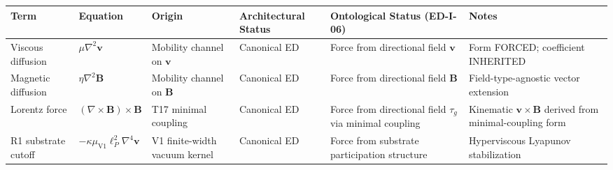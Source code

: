 \documentclass[
]{article}
\newcounter{none} %
\begin{document}
{\def\LTcaptype{none} %
\begin{longtable}[]{@{}
  >{\raggedright\arraybackslash}p{}
  >{\raggedright\arraybackslash}p{}
  >{\raggedright\arraybackslash}p{}
  >{\raggedright\arraybackslash}p{}
  >{\raggedright\arraybackslash}p{}
  >{\raggedright\arraybackslash}p{}@{}}
\toprule\noalign{}
\begin{minipage}[b]{\linewidth}\raggedright
Term
\end{minipage} & \begin{minipage}[b]{\linewidth}\raggedright
Equation
\end{minipage} & \begin{minipage}[b]{\linewidth}\raggedright
Origin
\end{minipage} & \begin{minipage}[b]{\linewidth}\raggedright
Architectural Status
\end{minipage} & \begin{minipage}[b]{\linewidth}\raggedright
Ontological Status (ED-I-06)
\end{minipage} & \begin{minipage}[b]{\linewidth}\raggedright
Notes
\end{minipage} \\
\midrule\noalign{}
\endhead
\bottomrule\noalign{}
\endlastfoot
Viscous diffusion & \(\mu\nabla^2\mathbf{v}\) & Mobility channel on
\(\mathbf{v}\) & Canonical ED & Force from directional field
\(\mathbf{v}\) & Form FORCED; coefficient INHERITED \\
Magnetic diffusion & \(\eta\nabla^2\mathbf{B}\) & Mobility channel on
\(\mathbf{B}\) & Canonical ED & Force from directional field
\(\mathbf{B}\) & Field-type-agnostic vector extension \\
Lorentz force & \((\nabla\times\mathbf{B})\times\mathbf{B}\) & T17
minimal coupling & Canonical ED & Force from directional field
\(\tau_g\) via minimal coupling & Kinematic
\(\mathbf{v}\times\mathbf{B}\) derived from minimal-coupling form \\
R1 substrate cutoff &
\(-\kappa\mu_\mathrm{V1}\ell_P^2\nabla^4\mathbf{v}\) & V1 finite-width
vacuum kernel & Canonical ED & Force from substrate participation
structure & Hyperviscous Lyapunov stabilization \\

\end{longtable}}
\end{document}
